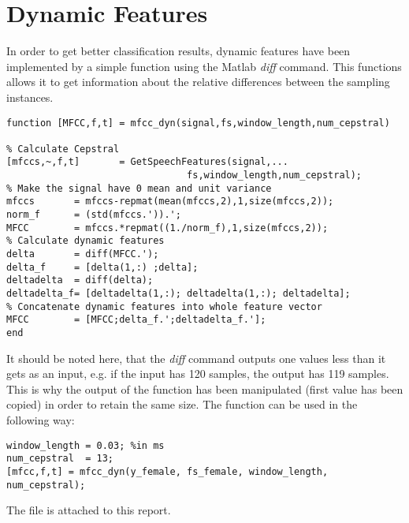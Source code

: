 \section{Dynamic Features}
In order to get better classification results, dynamic features have been implemented by a simple function using the Matlab \textit{diff} command. This functions allows it to get information about the relative differences between the sampling instances.
\begin{lstlisting}
function [MFCC,f,t] = mfcc_dyn(signal,fs,window_length,num_cepstral)

% Calculate Cepstral
[mfccs,~,f,t]       = GetSpeechFeatures(signal,...
                                fs,window_length,num_cepstral);
% Make the signal have 0 mean and unit variance
mfccs       = mfccs-repmat(mean(mfccs,2),1,size(mfccs,2));
norm_f      = (std(mfccs.')).';
MFCC        = mfccs.*repmat((1./norm_f),1,size(mfccs,2));
% Calculate dynamic features
delta       = diff(MFCC.');
delta_f     = [delta(1,:) ;delta];
deltadelta  = diff(delta);
deltadelta_f= [deltadelta(1,:); deltadelta(1,:); deltadelta];
% Concatenate dynamic features into whole feature vector
MFCC        = [MFCC;delta_f.';deltadelta_f.'];
end
\end{lstlisting}
It should be noted here, that the \textit{diff} command outputs one values less than it gets as an input, e.g. if the input has 120 samples, the output has 119 samples. This is why the output of the function has been manipulated (first value has been copied) in order to retain the same size. The function can be used in the following way:
\begin{lstlisting}
window_length = 0.03; %in ms
num_cepstral  = 13;
[mfcc,f,t] = mfcc_dyn(y_female, fs_female, window_length, num_cepstral);
\end{lstlisting}
The file is attached to this report.

